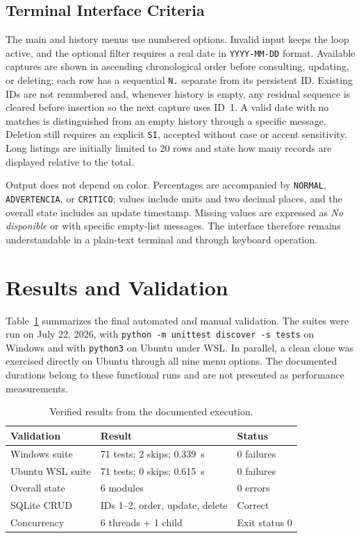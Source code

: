 \documentclass[conference]{IEEEtran}
\begin{document}
\subsection{Terminal Interface Criteria}
The main and history menus use numbered options. Invalid input keeps the loop active, and the optional filter requires a real date in \texttt{YYYY-MM-DD} format. Available captures are shown in ascending chronological order before consulting, updating, or deleting; each row has a sequential \texttt{N.} separate from its persistent ID. Existing IDs are not renumbered and, whenever history is empty, any residual sequence is cleared before insertion so the next capture uses ID~1. A valid date with no matches is distinguished from an empty history through a specific message. Deletion still requires an explicit \texttt{SI}, accepted without case or accent sensitivity. Long listings are initially limited to 20 rows and state how many records are displayed relative to the total.

Output does not depend on color. Percentages are accompanied by \texttt{NORMAL}, \texttt{ADVERTENCIA}, or \texttt{CRITICO}; values include units and two decimal places, and the overall state includes an update timestamp. Missing values are expressed as \emph{No disponible} or with specific empty-list messages. The interface therefore remains understandable in a plain-text terminal and through keyboard operation.

\section{Results and Validation}
Table~\ref{tab:resultados} summarizes the final automated and manual validation. The suites were run on July 22, 2026, with \texttt{python -m unittest discover -s tests} on Windows and with \texttt{python3} on Ubuntu under WSL. In parallel, a clean clone was exercised directly on Ubuntu through all nine menu options. The documented durations belong to these functional runs and are not presented as performance measurements.

\begin{table}[t]
\caption{Verified results from the documented execution.}
\label{tab:resultados}
\centering
\footnotesize
\begin{tabular}{@{}p{}p{}p{}@{}}
\toprule
Validation & Result & Status \\
\midrule
Windows suite & 71 tests; 2 skips; 0.339~s & 0 failures \\
Ubuntu WSL suite & 71 tests; 0 skips; 0.615~s & 0 failures \\
Overall state & 6 modules & 0 errors \\
SQLite CRUD & IDs 1--2, order, update, delete & Correct \\
Concurrency & 6 threads + 1 child & Exit status 0 \\
\bottomrule
\end{tabular}
\end{table}
\end{document}
